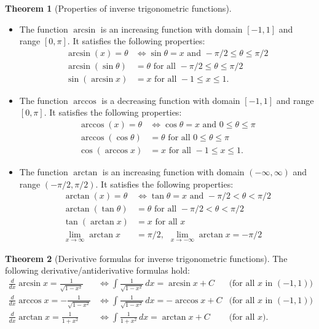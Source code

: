 \documentclass[11pt]{article}
\theoremstyle{definition}
\theoremstyle{named}
\newtheorem*{namedtheorem}{Theorem}
\numberwithin{myalgctr}{section}
\begin{document}
\begin{namedtheorem}[Properties of inverse trigonometric functions]\
  \begin{itemize}
    \item The function $\arcsin$ is an increasing function with domain $[-1,1]$ and range $[0,\pi]$. It satisfies the following properties:
    \begin{align*}
      \arcsin(x)=\theta &\iff \sin\theta=x \text{ and } -\pi/2\leq \theta\leq \pi/2\\
      \arcsin(\sin \theta)&=\theta \text{ for all } -\pi/2\leq \theta\leq \pi/2\\
      \sin(\arcsin x)&=x \text{ for all } -1\leq x\leq 1.
    \end{align*}
    \item The function $\arccos$ is a decreasing function with domain $[-1,1]$ and range $[0,\pi]$. It satisfies the following properties:
    \begin{align*}
      \arccos(x)=\theta &\iff \cos\theta=x \text{ and } 0\leq \theta\leq \pi\\
      \arccos(\cos \theta)&=\theta \text{ for all } 0\leq \theta\leq \pi\\
      \cos(\arccos x)&=x \text{ for all } -1\leq x\leq 1.
    \end{align*}
    \item The function $\arctan$ is an increasing function with domain $(-\infty, \infty)$ and range $(-\pi/2, \pi/2)$. It satisfies the following properties:
    \begin{align*}
      \arctan(x)=\theta &\iff \tan\theta=x \text{ and } -\pi/2< \theta< \pi/2\\
      \arctan(\tan \theta)&=\theta \text{ for all } -\pi/2< \theta< \pi/2\\
      \tan(\arctan x)&=x \text{ for all } x\\
      \lim_{x\to\infty}\arctan x&=\pi/2,\hspace{5pt} \lim_{x\to-\infty}\arctan x=-\pi/2
    \end{align*}
  \end{itemize}

\end{namedtheorem}
\begin{namedtheorem}[Derivative formulas for inverse trigonometric functions] The following derivative/antiderivative formulas hold:
  \begin{align*}
    \frac{d}{dx} \arcsin x=\frac{1}{\sqrt{1-x^2}}&\iff \int \frac{1}{\sqrt{1-x^2}}\, dx=\arcsin x+C &\text{(for all $x$ in $(-1,1)$)}\\
    \frac{d}{dx} \arccos x=-\frac{1}{\sqrt{1-x^2}}&\iff \int \frac{1}{\sqrt{1-x^2}}\, dx=-\arccos x+C &\text{(for all $x$ in $(-1,1)$)}\\
    \frac{d}{dx} \arctan x=\frac{1}{1+x^2}&\iff \int \frac{1}{1+x^2}\, dx=\arctan x+C &\text{(for all $x$)}.
  \end{align*}

\end{namedtheorem}
\end{document}
